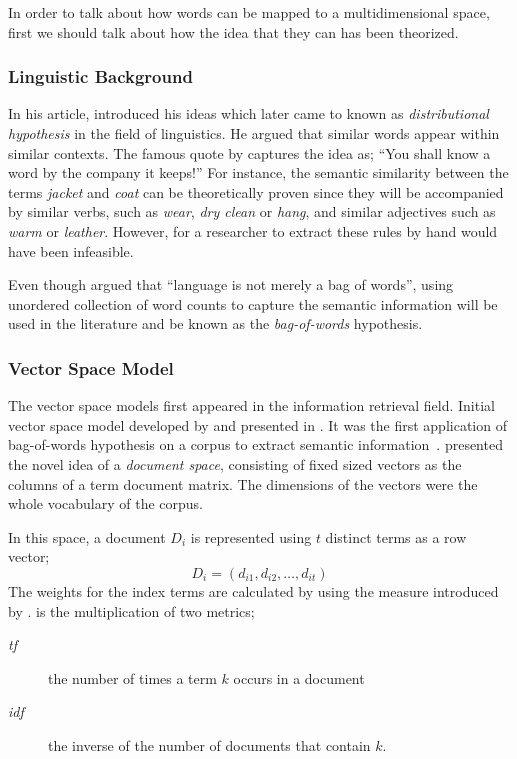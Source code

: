 In order to talk about how words can be mapped to a multidimensional space, first we should talk about how the idea that they can has been theorized.

\subsubsection{Linguistic Background}%
\label{ssub:linguistic_background}

In his \citeyear{harris_distributional_1954} article, \textcite{harris_distributional_1954} introduced his ideas which later came to known as \emph{distributional hypothesis} in the field of linguistics.
He argued that similar words appear within similar contexts.
The famous quote by \textcite{firth_synopsis_1957} captures the idea as;
\enquote{You shall know a word by the company it keeps!}
For instance, the semantic similarity between the terms \emph{jacket} and \emph{coat} can be theoretically proven since they will be accompanied by similar verbs, such as \emph{wear}, \emph{dry clean} or \emph{hang}, and similar adjectives such as \emph{warm} or \emph{leather}.
However, for a researcher to extract these rules by hand would have been infeasible.

Even though \citeauthor{harris_distributional_1954} argued that \enquote{language is not merely a bag of words}, using unordered collection of word counts to capture the semantic information will be used in the literature and be known as the \emph{bag-of-words} hypothesis.

\subsubsection{Vector Space Model}%
\label{ssub:vector_space_model}

The vector space models first appeared in the information retrieval field.
Initial vector space model developed by \textcite{salton_vector_1975} and presented in .
It was the first application of bag-of-words hypothesis on a corpus to extract semantic information~\cite{turney_frequency_2010}.
\citeauthor{salton_vector_1975} presented the novel idea of a \emph{document space}, consisting of fixed sized vectors as the columns of a term document matrix.
The dimensions of the vectors were the whole vocabulary of the corpus.

In this space, a document $D_i$ is represented using $t$ distinct terms as a row vector;
\begin{displaymath}
    D_{i} = (d_{i1}, d_{i2}, \ldots, d_{it})
\end{displaymath}
The weights for the index terms are calculated by using the \tfidf{} measure introduced by \textcite{jones_statistical_1972}.
\tfidf{} is the multiplication of two metrics;
\begin{description}
    \item[\emph{tf}] the number of times a term $k$ occurs in a document
    \item[\emph{idf}] the inverse of the number of documents that contain $k$.
\end{description}

